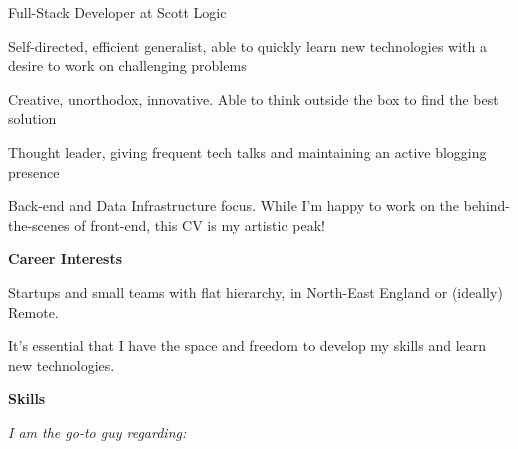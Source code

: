 \documentclass[hidelinks, 12pt, a4paper]{article}
\begin{document}
{\begin{minipage}{\dimexpr0.35\textwidth-2\fboxrule-2\fboxsep\relax}
\begin{center}
\begin{minipage}{0.9\linewidth}
					\vspace{-8pt}
					
					Full-Stack Developer at Scott Logic
					
					\vspace{8pt}
					
					Self-directed, efficient generalist, able to quickly learn new technologies with a desire to work on challenging problems
					
					\vspace{8pt}
					
					Creative, unorthodox, innovative. Able to think outside the box to find the best solution
					
					\vspace{8pt}
					
					Thought leader, giving frequent tech talks and maintaining an active blogging presence
					
					\vspace{8pt}
					
					Back-end and Data Infrastructure focus. While I'm happy to work on the behind-the-scenes of front-end, this CV is my artistic peak!
					
					\vspace{4pt}
					
					\begin{center}
						\begin{Large}
							\textbf{Career Interests}
						\end{Large}
					\end{center}
				
					\vspace{-8pt}
					
					Startups and small teams with flat hierarchy, in North-East England or (ideally) Remote.
					
					\vspace{8pt}
					
					It's essential that I have the space and freedom to develop my skills and learn new technologies.
			
					\begin{center}
						\begin{Large}
							\textbf{Skills}
						\end{Large}
					\end{center}
				
				\vspace{-8pt}
				\emph{I am the go-to guy regarding:}
				

\end{minipage}
\end{center}
\end{minipage}}
\end{document}
